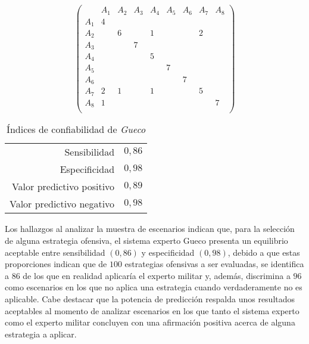 \begin{table}[!ht]
  \begin{center}
    $$
    \left(\begin{array}{c|cccccccc}
          & A_1 & A_2 & A_3 & A_4 & A_5 & A_6 & A_7 & A_8\\\hline
      A_1 &  4  &     &     &     &     &     &     &   \\
      A_2 &     &  6  &     &  1  &     &     &  2  &   \\
      A_3 &     &     &  7  &     &     &     &     &   \\
      A_4 &     &     &     &  5  &     &     &     &   \\
      A_5 &     &     &     &     &  7  &     &     &   \\
      A_6 &     &     &     &     &     &  7  &     &   \\
      A_7 &  2  &  1  &     &  1  &     &     &  5  &   \\
      A_8 &  1  &     &     &     &     &     &     &  7\\
    \end{array}\right)
    $$

    \begin{tabular}{r@{ = }c}
      Sensibilidad & $0,86$\\
      Especificidad & $0,98$\\
      Valor predictivo positivo & $0,89$\\
      Valor predictivo negativo & $0,98$\\
    \end{tabular}
    \caption{Índices de confiabilidad de \emph{Gueco}}
    \label{cuadro:indicesdegueco}
  \end{center}
\end{table}

Los hallazgos al analizar la muestra de escenarios indican que, para la selección de alguna estrategia ofensiva, el sistema experto Gueco presenta un equilibrio aceptable entre sensibilidad $(0,86)$ y especificidad $(0,98)$, debido a que estas proporciones indican que de $100$ estrategias ofensivas a ser evaluadas, se identifica a $86$ de los que en realidad aplicaría el experto militar y, además, discrimina a $96$ como escenarios en los que no aplica una estrategia cuando verdaderamente no es aplicable. Cabe destacar que la potencia de predicción respalda unos resultados aceptables al momento de analizar escenarios en los que tanto el sistema experto como el experto militar concluyen con una afirmación positiva acerca de alguna estrategia a aplicar.
